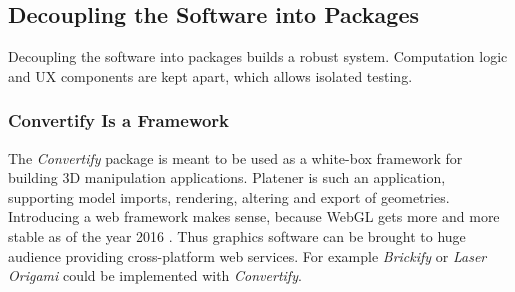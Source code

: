 \documentclass[../ClassicThesis.tex]{subfiles}
\begin{document}


\subsection{Decoupling the Software into Packages}

Decoupling the software into packages builds a robust system. Computation logic
and UX components are kept apart, which allows isolated testing.

\subsubsection{Convertify Is a Framework}

The \emph{Convertify} package is meant to be used as a white-box framework for building
3D manipulation applications. Platener is such an application, supporting model
imports, rendering, altering and export of geometries. Introducing a web
framework makes sense, because WebGL gets more and more stable as of the year
2016 . Thus graphics software can be brought to huge
audience providing cross-platform web services. For example \emph{Brickify} or \emph{Laser
Origami} could be implemented with \emph{Convertify}.

\end{document}
